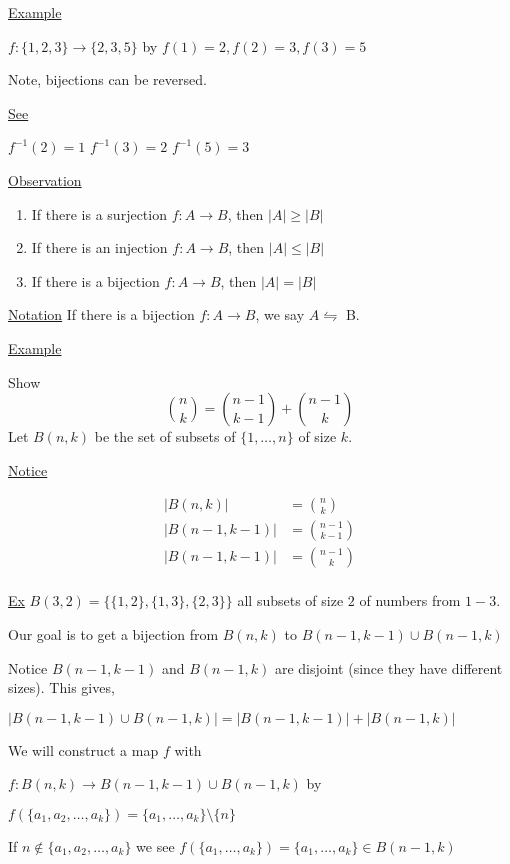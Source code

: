 \documentclass{article}
\begin{document}
\underline{Example}

$f: \{1,2,3\} \to \{2,3,5\}$ by $f(1)=2, f(2)=3, f(3)=5$

Note, bijections can be reversed. 

\underline{See}

$f^{-1}(2) = 1$
$f^{-1}(3)=2$
$f^{-1}(5)=3$

\underline{Observation}

\begin{enumerate}
    \item If there is a surjection $f: A \to B$, then $|A| \ge |B|$
    \item If there is an injection $f: A \to B$, then $|A| \le |B|$
    \item If there is a bijection $f: A \to B$, then $|A| = |B|$
\end{enumerate}

\underline{Notation} If there is a bijection $f: A \to B$, we say $A \leftrightharpoons$ B.


\underline{Example}

Show 
\begin{equation*}
\binom{n}{k} = \binom{n-1}{k-1} + \binom{n-1}{k}
\end{equation*}
Let $B(n,k)$ be the set of subsets of $\{1,\ldots,n\}$ of size $k$.

\underline{Notice}

\begin{align*}
   |B(n,k)| &= \binom{n}{k} \\
   |B(n-1,k-1)| &= \binom{n-1}{k-1} \\ 
   |B(n-1,k-1)| &= \binom{n-1}{k} \\
\end{align*}

\underline{Ex} $B(3,2) = \{ \{1,2\}, \{1,3\}, \{2,3\} \}$ all subsets of size $2$ of numbers from $1-3$. 

Our goal is to get a bijection from $B(n,k)$ to $B(n-1,k-1) \cup B(n-1,k)$

Notice $B(n-1,k-1)$ and $B(n-1,k)$ are disjoint (since they have different sizes). This gives, 

$|B(n-1,k-1) \cup B(n-1,k)| = | B(n-1,k-1)| + |B(n-1, k)|$


We will construct a map $f$ with 

$f: B(n,k) \to B(n-1,k-1) \cup B(n-1, k)$  by 

$f(\{a_1,a_2,\ldots,a_k\}) = \{a_1,\ldots,a_k\} \setminus \{n\}$ 

If $n \notin \{a_1,a_2,\ldots,a_k\}$ we see $f(\{a_1,\ldots,a_k\}) = \{a_1,\ldots,a_k\} \in B(n-1, k)$
\end{document}
